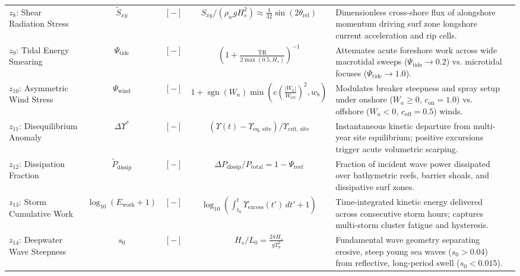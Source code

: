\documentclass[journal]{IEEEtran}
\begin{document}
\begin{table}[t]
{\begin{tabular}{lcccp{5.5cm}p{9.0cm}}
$z_8$: Shear Radiation Stress & $\tilde{S}_{xy}$ & $[-]$ & $S_{xy} / (\rho_w g H_s^2) \approx \frac{1}{32}\sin(2\theta_{\text{rel}})$ & Dimensionless cross-shore flux of alongshore momentum driving surf zone longshore current acceleration and rip cells. \\
$z_9$: Tidal Energy Smearing & $\Psi_{\text{tide}}$ & $[-]$ & $\left(1 + \frac{\text{TR}}{2\max(0.5, H_s)}\right)^{-1}$ & Attenuates acute foreshore work across wide macrotidal sweeps ($\Psi_{\text{tide}} \to 0.2$) vs. microtidal focuses ($\Psi_{\text{tide}} \to 1.0$). \\
$z_{10}$: Asymmetric Wind Stress & $\Psi_{\text{wind}}$ & $[-]$ & $1 + \operatorname{sgn}(W_a)\min\left(c\left(\frac{|W_a|}{W_{\text{ref}}}\right)^2, w_b\right)$ & Modulates breaker steepness and spray setup under onshore ($W_a \ge 0$, $c_{\text{on}}=1.0$) vs. offshore ($W_a < 0$, $c_{\text{off}}=0.5$) winds. \\
$z_{11}$: Disequilibrium Anomaly & $\Delta\Upsilon^*$ & $[-]$ & $(\Upsilon(t) - \Upsilon_{\text{eq, site}}) / \Upsilon_{\text{crit, site}}$ & Instantaneous kinetic departure from multi-year site equilibrium; positive excursions trigger acute volumetric scarping. \\
$z_{12}$: Dissipation Fraction & $\tilde{P}_{\text{dissip}}$ & $[-]$ & $\Delta P_{\text{dissip}} / P_{\text{total}} = 1 - \Psi_{\text{reef}}$ & Fraction of incident wave power dissipated over bathymetric reefs, barrier shoals, and dissipative surf zones. \\
$z_{13}$: Storm Cumulative Work & $\log_{10}(E_{\text{work}}+1)$ & $[-]$ & $\log_{10}\left(\int_{t_0}^t \Upsilon_{\text{excess}}(t')\,dt' + 1\right)$ & Time-integrated kinetic energy delivered across consecutive storm hours; captures multi-storm cluster fatigue and hysteresis. \\
$z_{14}$: Deepwater Wave Steepness & $s_0$ & $[-]$ & $H_s / L_0 = \frac{2\pi H_s}{g T_p^2}$ & Fundamental wave geometry separating erosive, steep young sea waves ($s_0 > 0.04$) from reflective, long-period swell ($s_0 < 0.015$). \\
\bottomrule
\end{tabular}%
}
\end{table}
\end{document}
